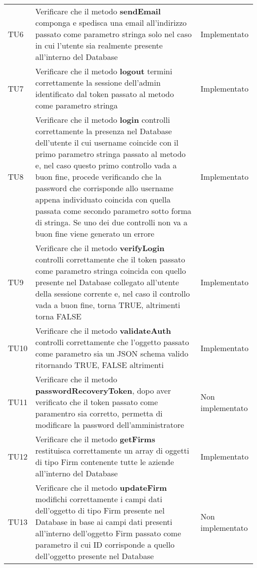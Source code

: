 \documentclass[../PianoDiQualifica_v3.0.0.tex]{subfiles}
\begin{document}
\begin{longtable}[c] { >{\centering\arraybackslash}p{2cm} p{9cm} >{\centering\arraybackslash}p{4cm}}
			\midrule
			\addlinespace[0.3em]
			TU6 & Verificare che il metodo \textbf{sendEmail} componga e spedisca una email all'indirizzo passato come parametro stringa solo nel caso in cui l'utente sia realmente presente all'interno del Database & Implementato \\
			\addlinespace[0.3em]
			\midrule
			\addlinespace[0.3em]
			TU7 & Verificare che il metodo \textbf{logout} termini correttamente la sessione dell'admin identificato dal token passato al metodo come parametro stringa & Implementato \\
			\addlinespace[0.3em]
			\midrule
			\addlinespace[0.3em]
			TU8 & Verificare che il metodo \textbf{login} controlli correttamente la presenza nel Database dell'utente il cui username coincide con il primo parametro stringa passato al metodo e, nel caso questo primo controllo vada a buon fine, procede verificando che la password che corrisponde allo username appena individuato coincida con quella passata come secondo parametro sotto forma di stringa. Se uno dei due controlli non va a buon fine viene generato un errore & Implementato \\
			\addlinespace[0.3em]
			\midrule
			\addlinespace[0.3em]
			TU9 & Verificare che il metodo \textbf{verifyLogin} controlli correttamente che il token passato come parametro stringa coincida con quello presente nel Database collegato all'utente della sessione corrente e, nel caso il controllo vada a buon fine, torna TRUE, altrimenti torna FALSE & Implementato \\
			\addlinespace[0.3em]
			\midrule
			\addlinespace[0.3em]
			TU10 & Verificare che il metodo \textbf{validateAuth} controlli correttamente che l'oggetto passato come parametro sia un JSON schema valido ritornando TRUE, FALSE altrimenti & Implementato \\
			\addlinespace[0.3em]
			\midrule
			\addlinespace[0.3em]
			TU11 & Verificare che il metodo \textbf{passwordRecoveryToken}, dopo aver verificato che il token passato come paramentro sia corretto, permetta di modificare la password dell'amministratore & Non implementato \\
			\addlinespace[0.3em]
			\midrule
			\addlinespace[0.3em]
			TU12 & Verificare che il metodo \textbf{getFirms} restituisca correttamente un array di oggetti di tipo Firm contenente tutte le aziende all'interno del Database & Implementato \\
			\addlinespace[0.3em]
			\midrule
			\addlinespace[0.3em]
			TU13 & Verificare che il metodo \textbf{updateFirm} modifichi correttamente i campi dati dell'oggetto di tipo Firm presente nel Database in base ai campi dati presenti all'interno dell'oggetto Firm passato come parametro il cui ID corrisponde a quello dell'oggetto presente nel Database & Non implementato \\

\end{longtable}
\end{document}
